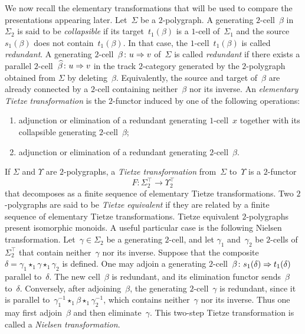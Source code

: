 \documentclass[a4paper, twoside, 11pt, english]{article}
\begin{document}
We now recall the elementary transformations that will be used to compare the presentations appearing later.
Let~$\Sigma$ be a $2$-polygraph.
A generating $2$-cell~$\beta$ in~$\Sigma_2$ is said to be
\emph{collapsible} if its target~$t_1(\beta)$ is a $1$-cell of~$\Sigma_1$ and the source~$s_1(\beta)$ does not contain~$t_1(\beta)$.
In that case, the $1$-cell~$t_1(\beta)$ is called \emph{redundant}.
A generating $2$-cell~$\beta\colon u\Rightarrow v$ of~$\Sigma$ is called \emph{redundant} if there
exists a parallel $2$-cell~$\widehat{\beta}\colon u\Rightarrow v$ in the track $2$-category generated by the $2$-polygraph obtained from
$\Sigma$ by deleting~$\beta$. Equivalently, the source and target of~$\beta$
are already connected by a $2$-cell containing neither~$\beta$ nor its
inverse.
An \emph{elementary Tietze transformation} is the $2$-functor induced by one
of the following operations:
\begin{enumerate}[\bf i)]
\item adjunction or elimination of a redundant generating $1$-cell~$x$
together with its collapsible generating $2$-cell~$\beta$;
\item adjunction or elimination of a redundant generating
$2$-cell~$\beta$.
\end{enumerate}
If $\Sigma$ and $\Upsilon$ are $2$-polygraphs, a \emph{Tietze transformation} from~$\Sigma$ to~$\Upsilon$ is a $2$-functor
\[
F\colon \Sigma_2^\top \longrightarrow \Upsilon_2^\top
\]
that decomposes as a finite sequence of elementary Tietze transformations.
Two $2$-polygraphs are said to be \emph{Tietze equivalent} if they are related
by a finite sequence of elementary Tietze transformations. 
Tietze equivalent $2$-polygraphs present isomorphic monoids.
A useful particular case is the following Nielsen transformation.
Let~$\gamma\in\Sigma_2$ be a generating $2$-cell, and let
$\gamma_1$ and~$\gamma_2$ be $2$-cells of~$\Sigma_2^\top$ that
contain neither~$\gamma$ nor its inverse. Suppose that the composite~$
\delta
=
\gamma_1\star_1\gamma\star_1\gamma_2$
is defined. One may adjoin a generating $2$-cell~$\beta\colon s_1(\delta)\Rightarrow t_1(\delta)$
parallel to~$\delta$. The new cell~$\beta$ is redundant, and its
elimination functor sends~$\beta$ to~$\delta$.
Conversely, after adjoining~$\beta$, the generating $2$-cell~$\gamma$
is redundant, since it is parallel to~$\gamma_1^{-1}\star_1\beta\star_1\gamma_2^{-1}$,
which contains neither~$\gamma$ nor its inverse.  Thus one may first
adjoin~$\beta$ and then eliminate~$\gamma$. This two-step Tietze
transformation is called a \emph{Nielsen transformation}. 
\end{document}
